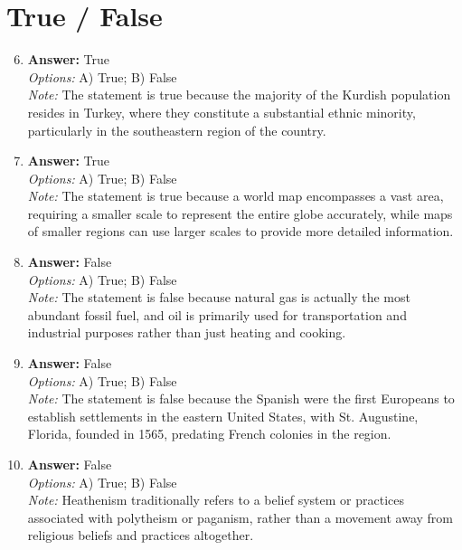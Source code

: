 \documentclass[12pt]{article}
\begin{document}
\section*{True / False}
\begin{enumerate}[label=\arabic*.]
\setcounter{enumi}{5}
\item \textbf{Answer:} True
\\ \textit{Options:} A) True; B) False
\\ \textit{Note:} The statement is true because the majority of the Kurdish population resides in Turkey, where they constitute a substantial ethnic minority, particularly in the southeastern region of the country.
\item \textbf{Answer:} True
\\ \textit{Options:} A) True; B) False
\\ \textit{Note:} The statement is true because a world map encompasses a vast area, requiring a smaller scale to represent the entire globe accurately, while maps of smaller regions can use larger scales to provide more detailed information.
\item \textbf{Answer:} False
\\ \textit{Options:} A) True; B) False
\\ \textit{Note:} The statement is false because natural gas is actually the most abundant fossil fuel, and oil is primarily used for transportation and industrial purposes rather than just heating and cooking.
\item \textbf{Answer:} False
\\ \textit{Options:} A) True; B) False
\\ \textit{Note:} The statement is false because the Spanish were the first Europeans to establish settlements in the eastern United States, with St. Augustine, Florida, founded in 1565, predating French colonies in the region.
\item \textbf{Answer:} False
\\ \textit{Options:} A) True; B) False
\\ \textit{Note:} Heathenism traditionally refers to a belief system or practices associated with polytheism or paganism, rather than a movement away from religious beliefs and practices altogether.
\end{enumerate}
\end{document}
